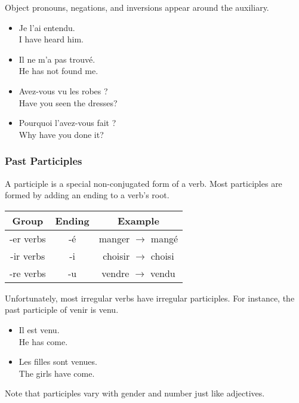 Object pronouns, negations, and inversions appear around the auxiliary.

\begin{itemize}
  \item  Je l'ai entendu. \\ I have heard him.
	\item  Il ne m'a pas trouv{\'e}. \\ He has not found me.
	\item  Avez-vous vu les robes ? \\ Have you seen the dresses?
	\item  Pourquoi l'avez-vous fait ? \\ Why have you done it?
\end{itemize}

\subsubsection{Past Participles}

A participle is a special non-conjugated form of a verb. Most participles are formed by adding an ending to a verb's root.

\begin{center}\begin{tabular}{|c|c|c|}
\hline
\textbf{Group} & \textbf{Ending} & \textbf{Example} \\ \hline
-er verbs      & -{\'e}              & manger $\rightarrow$ mang{\'e}   \\ \hline
-ir verbs      & -i              & choisir $\rightarrow$ choisi \\ \hline
-re verbs      & -u              & vendre $\rightarrow$ vendu          \\ \hline
\end{tabular}\end{center}

Unfortunately, most irregular verbs have irregular participles. For instance, the past participle of venir is venu.

\begin{itemize}
  \item  Il est venu. \\ He has come.
	\item  Les filles sont venues. \\ The girls have come.
\end{itemize}

Note that participles vary with gender and number just like adjectives.

